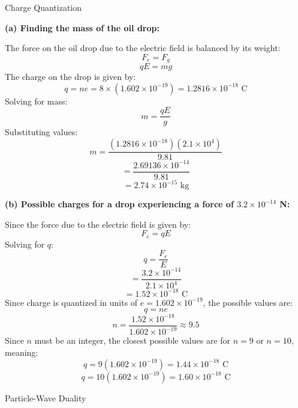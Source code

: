 \documentclass[addpoints]{exam}
\begin{document}
\begin{questions}
\vspace{1cm}

\question Charge Quantization
\begin{solution}

\textbf{(a) Finding the mass of the oil drop:}  

The force on the oil drop due to the electric field is balanced by its weight:  
\[
F_e = F_g
\]
\[
qE = mg
\]
The charge on the drop is given by:  
\[
q = n e = 8 \times (1.602 \times 10^{-19}) = 1.2816 \times 10^{-18} \text{ C}
\]
Solving for mass:  
\[
m = \frac{qE}{g}
\]
Substituting values:  
\[
m = \frac{(1.2816 \times 10^{-18}) (2.1 \times 10^4)}{9.81}
\]
\[
= \frac{2.69136 \times 10^{-14}}{9.81}
\]
\[
= 2.74 \times 10^{-15} \text{ kg}
\]

\textbf{(b) Possible charges for a drop experiencing a force of \( 3.2 \times 10^{-14} \) N:}  

Since the force due to the electric field is given by:  
\[
F_e = qE
\]
Solving for \( q \):  
\[
q = \frac{F_e}{E}
\]
\[
= \frac{3.2 \times 10^{-14}}{2.1 \times 10^4}
\]
\[
= 1.52 \times 10^{-18} \text{ C}
\]
Since charge is quantized in units of \( e = 1.602 \times 10^{-19} \), the possible values are:  
\[
q = n e
\]
\[
n = \frac{1.52 \times 10^{-18}}{1.602 \times 10^{-19}} \approx 9.5
\]
Since \( n \) must be an integer, the closest possible values are for \( n = 9 \) or \( n = 10 \), meaning:  
\[
q = 9(1.602 \times 10^{-19}) = 1.44 \times 10^{-18} \text{ C}
\]
\[
q = 10(1.602 \times 10^{-19}) = 1.60 \times 10^{-18} \text{ C}
\]
\end{solution}


\question[8] Particle-Wave Duality
\end{questions}
\end{document}
